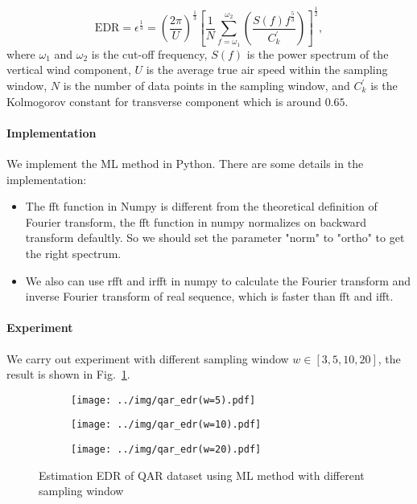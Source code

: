 \documentclass[runningheads]{llncs}
\begin{document}
\begin{equation}
    \mbox{EDR}=\epsilon^{\frac13}=\left(\frac{2\pi}{U}\right)^{\frac13}\left[\frac1N \sum_{f=\omega_1}^{\omega_2}\left(\frac{S(f)f^{\frac53}}{C^{'}_k}\right)\right]^{\frac12},
\end{equation}
where $\omega_1$ and $\omega_2$ is the cut-off frequency, $S(f)$ is the power spectrum of the vertical wind component, $U$ is the average true air speed within the sampling window, $N$ is the number of data points in the sampling window, and $C^{'}_k$ is the Kolmogorov constant for transverse component which is around $0.65$.

\paragraph{Implementation}

We implement the ML method in Python. There are some details in the implementation:

\begin{itemize}
    \item The fft function in Numpy\cite{fft} is different from the theoretical definition of Fourier transform, the fft function in numpy normalizes on backward transform defaultly. 
    So we should set the parameter "norm" to "ortho" to get the right spectrum.
    \item We also can use rfft and irfft in numpy to calculate the Fourier transform and inverse Fourier transform of real sequence, which is faster than fft and ifft.
\end{itemize}

\paragraph{Experiment}

We carry out experiment with different sampling window $w \in [3,5,10,20]$, the result is shown in Fig.~\ref{fig:2}.

\begin{figure}[!htbp]
    \centering
    \begin{subfigure}{.4\textwidth}
        \centering
        \texttt{[image: ../img/qar\_edr(w=5).pdf]}
    \end{subfigure}
    \begin{subfigure}{.4\textwidth}
        \centering
        \texttt{[image: ../img/qar\_edr(w=10).pdf]}
    \end{subfigure}
    \begin{subfigure}{.4\textwidth}
        \centering
        \texttt{[image: ../img/qar\_edr(w=20).pdf]}
    \end{subfigure}
    \caption{Estimation EDR of QAR dataset using ML method with different sampling window}
    \label{fig:2}
\end{figure}
\end{document}
